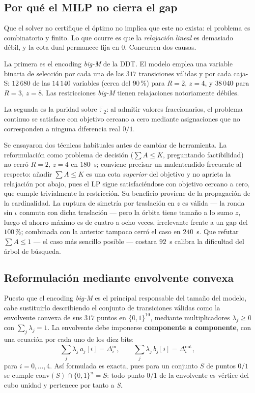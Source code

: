 \documentclass[conference]{IEEEtran}
\newcommand{\Fdos}{\mathbb{F}_2}
\begin{document}
\subsection{Por qué el MILP no cierra el gap}

Que el solver no certifique el óptimo no implica que este no exista: el problema es
combinatorio y finito. Lo que ocurre es que la \emph{relajación lineal} es demasiado
débil, y la cota dual permanece fija en $0$. Concurren dos causas.

La primera es el encoding \emph{big-M} de la DDT. El modelo emplea una variable binaria de
selección por cada una de las $317$ transiciones válidas y por cada caja-S: $12\,680$ de
las $14\,140$ variables (cerca del $90\,\%$) para $R=2$, $z=4$, y $38\,040$ para $R=3$,
$z=8$. Las restricciones \emph{big-M} tienen relajaciones notoriamente débiles.

La segunda es la paridad sobre $\Fdos$: al admitir valores fraccionarios, el problema
continuo se satisface con objetivo cercano a cero mediante asignaciones que no
corresponden a ninguna diferencia real $0/1$.

Se ensayaron dos técnicas habituales antes de cambiar de herramienta. La reformulación
como problema de decisión ($\sum A \le K$, preguntando factibilidad) no cerró $R=2$,
$z=4$ en $180$~s; conviene precisar un malentendido frecuente al respecto: añadir
$\sum A \le K$ es una cota \emph{superior} del objetivo y no aprieta la relajación por
abajo, pues el LP sigue satisfaciéndose con objetivo cercano a cero, que cumple
trivialmente la restricción. Su beneficio proviene de la propagación de la cardinalidad.
La ruptura de simetría por traslación en $z$ es válida --- la ronda sin $\iota$ conmuta con
dicha traslación --- pero la órbita tiene tamaño a lo sumo $z$, luego el ahorro máximo es
de cuatro a ocho veces, irrelevante frente a un gap del $100\,\%$; combinada con la
anterior tampoco cerró el caso en $240$~s. Que refutar $\sum A \le 1$ --- el caso más
sencillo posible --- costara $92$~s calibra la dificultad del árbol de búsqueda.

\subsection{Reformulación mediante envolvente convexa}\label{sec:hull}

Puesto que el encoding \emph{big-M} es el principal responsable del tamaño del modelo,
cabe sustituirlo describiendo el conjunto de transiciones válidas como la envolvente
convexa de sus $317$ puntos en $\{0,1\}^{10}$, mediante multiplicadores
$\lambda_j\ge0$ con $\sum_j\lambda_j=1$. La envolvente debe imponerse
\textbf{componente a componente}, con una ecuación por cada uno de los diez bits:
\begin{equation}\label{eq:hull}
\sum_j \lambda_j\,a_j[i]=\Delta^{\mathrm{in}}_i,\qquad
\sum_j \lambda_j\,b_j[i]=\Delta^{\mathrm{out}}_i,
\end{equation}
para $i=0,\dots,4$. Así formulada es exacta, pues para un conjunto $S$ de puntos $0/1$ se
cumple $\mathrm{conv}(S)\cap\{0,1\}^n=S$: todo punto $0/1$ de la envolvente es vértice del
cubo unidad y pertenece por tanto a $S$.
\end{document}
